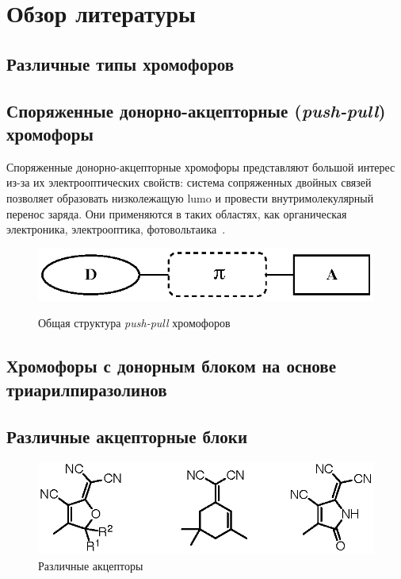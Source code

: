 \section{Обзор литературы}

\subsection{Различные типы хромофоров}

\subsection{Споряженные донорно-акцепторные (\emph{push-pull}) хромофоры}

Споряженные донорно-акцепторные хромофоры представляют большой интерес из-за их электрооптических свойств: система сопряженных двойных связей позволяет образовать низколежащую \ac{lumo} и провести внутримолекулярный перенос заряда. Они применяются в таких областях, как органическая электроника, электрооптика, фотовольтаика~\cite{Bures2014a}.

\begin{figure}
    \centering
    \includegraphics{sections/literature/img/D-p-A_chromophores.eps}\label{fig:D-p-A_chromophores}
    \caption{Общая структура \emph{push-pull} хромофоров}
\end{figure}

\subsection{Хромофоры с донорным блоком на основе триарилпиразолинов}

\subsection{Различные акцепторные блоки}

\begin{figure}
    \centering
    \includegraphics{sections/literature/img/acceptors.eps}
    \caption{Различные акцепторы~\cite{Dalton2010a}}
    \label{fig:acceptors}
\end{figure}

